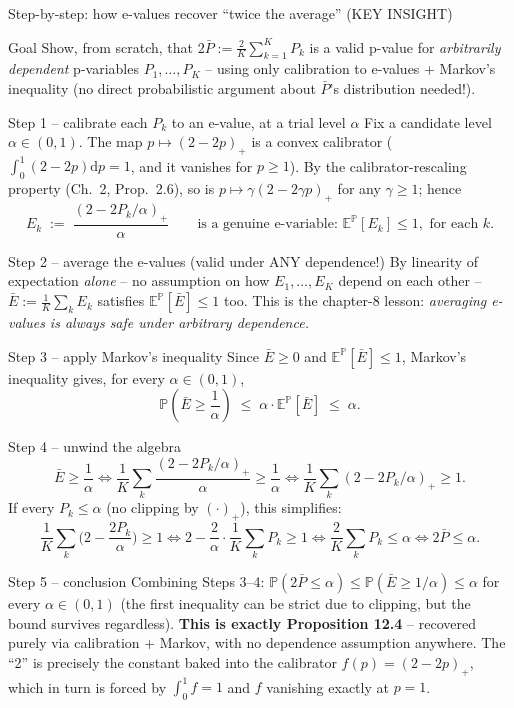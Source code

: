 \documentclass[aspectratio=169,10pt]{beamer}
\newcommand{\PP}{\mathbb{P}}
\newcommand{\EE}{\mathbb{E}}
\begin{document}
\begin{frame}[allowframebreaks]{Step-by-step: how e-values recover ``twice the average'' (KEY INSIGHT)}
  \begin{block}{Goal}
    Show, from scratch, that $2\bar P:=\tfrac{2}{K}\sum_{k=1}^K P_k$ is a valid p-value for \emph{arbitrarily dependent} p-variables $P_1,\dots,P_K$ -- using only calibration to e-values + Markov's inequality (no direct probabilistic argument about $\bar P$'s distribution needed!).
  \end{block}
  \begin{block}{Step 1 -- calibrate each $P_k$ to an e-value, at a trial level $\alpha$}
    Fix a candidate level $\alpha\in(0,1)$. The map $p\mapsto(2-2p)_+$ is a convex calibrator ($\int_0^1(2-2p)\mathrm{d}p=1$, and it vanishes for $p\ge1$). By the calibrator-rescaling property (Ch.\ 2, Prop.\ 2.6), so is $p\mapsto\gamma(2-2\gamma p)_+$ for any $\gamma\ge1$; hence
    \[
      E_k \;:=\; \frac{(2-2P_k/\alpha)_+}{\alpha} \qquad \text{is a genuine e-variable: } \EE^\PP[E_k]\le1, \text{ for each } k.
    \]
  \end{block}
  \begin{block}{Step 2 -- average the e-values (valid under ANY dependence!)}
    By linearity of expectation \emph{alone} -- no assumption on how $E_1,\dots,E_K$ depend on each other -- $\bar E:=\tfrac1K\sum_kE_k$ satisfies $\EE^\PP[\bar E]\le1$ too. This is the chapter-8 lesson: \emph{averaging e-values is always safe under arbitrary dependence.}
  \end{block}

  \framebreak

  \begin{block}{Step 3 -- apply Markov's inequality}
    Since $\bar E\ge0$ and $\EE^\PP[\bar E]\le1$, Markov's inequality gives, for every $\alpha\in(0,1)$,
    \[
      \PP\!\left(\bar E \ge \frac1\alpha\right) \;\le\; \alpha\cdot\EE^\PP[\bar E] \;\le\; \alpha.
    \]
  \end{block}
  \begin{block}{Step 4 -- unwind the algebra}
    \[
      \bar E\ge\frac1\alpha \iff \frac1K\sum_k\frac{(2-2P_k/\alpha)_+}{\alpha}\ge\frac1\alpha \iff \frac1K\sum_k(2-2P_k/\alpha)_+ \ge 1.
    \]
    If every $P_k\le\alpha$ (no clipping by $(\cdot)_+$), this simplifies:
    \[
      \frac1K\sum_k\Big(2-\frac{2P_k}\alpha\Big)\ge1 \iff 2-\frac2\alpha\cdot\frac1K\sum_kP_k\ge1 \iff \frac2K\sum_kP_k \le \alpha \iff 2\bar P\le\alpha.
    \]
  \end{block}
  \begin{block}{Step 5 -- conclusion}
    Combining Steps 3--4: $\PP(2\bar P\le\alpha) \le \PP(\bar E\ge1/\alpha) \le \alpha$ for every $\alpha\in(0,1)$ (the first inequality can be strict due to clipping, but the bound survives regardless). \textbf{This is exactly Proposition 12.4} -- recovered purely via calibration + Markov, with no dependence assumption anywhere. The ``2'' is precisely the constant baked into the calibrator $f(p)=(2-2p)_+$, which in turn is forced by $\int_0^1f=1$ and $f$ vanishing exactly at $p=1$.
  \end{block}
\end{frame}
\end{document}
